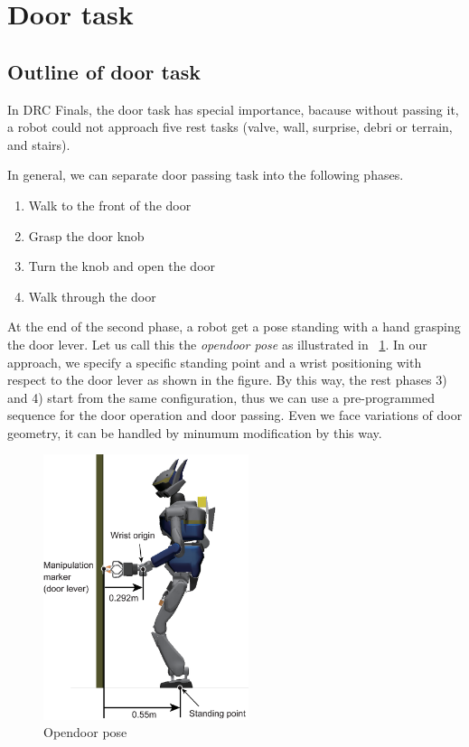 \section{Door task}
	\label{sub:door}

\subsection{Outline of door task}
%
In DRC Finals, the door task has special importance, bacause without passing it, a robot could not approach five rest tasks (valve, wall, surprise, debri or terrain, and stairs).
   
In general, we can separate door passing task into the following phases.
%
\begin{enumerate}
\item Walk to the front of the door 
\item Grasp the door knob
\item Turn the knob and open the door
\item Walk through the door
\end{enumerate}
%

%

At the end of the second phase, a robot get a pose standing with a hand grasping 
the door lever. Let us call this the {\it opendoor pose} as illustrated in \figurename~\ref{fig:door_approaching_config}.
In our approach, we specify a specific standing point and a wrist positioning with respect to 
the door lever as shown in the figure.
By this way, the rest phases 3) and 4) start from the same configuration, thus we can 
use a pre-programmed sequence for the door operation and door passing.
Even we face variations of door geometry, it can be handled by minumum modification by this way.

\begin{figure}[t]
  \centering
  \includegraphics[width = 6cm]{img/door_approaching_config.eps}
  \caption{Opendoor pose}
  \label{fig:door_approaching_config}
\end{figure}

